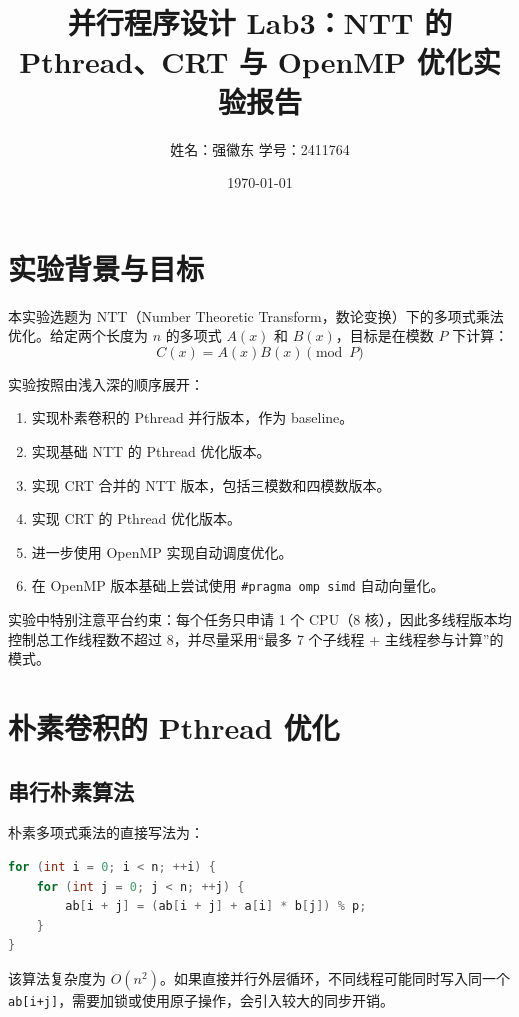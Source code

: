\documentclass[UTF8,a4paper,12pt]{ctexart}
\title{并行程序设计 Lab3：NTT 的 Pthread、CRT 与 OpenMP 优化实验报告}
\author{姓名：强徽东 {\hspace{3cm}} \quad 学号：2411764}
\date{\today}
\begin{document}
\maketitle

\section{实验背景与目标}

本实验选题为 NTT（Number Theoretic Transform，数论变换）下的多项式乘法优化。给定两个长度为 $n$ 的多项式 $A(x)$ 和 $B(x)$，目标是在模数 $P$ 下计算：
\[
C(x)=A(x)B(x)\pmod P
\]

实验按照由浅入深的顺序展开：

\begin{enumerate}
    \item 实现朴素卷积的 Pthread 并行版本，作为 baseline。
    \item 实现基础 NTT 的 Pthread 优化版本。
    \item 实现 CRT 合并的 NTT 版本，包括三模数和四模数版本。
    \item 实现 CRT 的 Pthread 优化版本。
    \item 进一步使用 OpenMP 实现自动调度优化。
    \item 在 OpenMP 版本基础上尝试使用 \texttt{\#pragma omp simd} 自动向量化。
\end{enumerate}

实验中特别注意平台约束：每个任务只申请 1 个 CPU（8 核），因此多线程版本均控制总工作线程数不超过 8，并尽量采用``最多 7 个子线程 + 主线程参与计算''的模式。

\section{朴素卷积的 Pthread 优化}

\subsection{串行朴素算法}

朴素多项式乘法的直接写法为：

\begin{lstlisting}[language=C++]
for (int i = 0; i < n; ++i) {
    for (int j = 0; j < n; ++j) {
        ab[i + j] = (ab[i + j] + a[i] * b[j]) % p;
    }
}
\end{lstlisting}

该算法复杂度为 $O(n^2)$。如果直接并行外层循环，不同线程可能同时写入同一个 \texttt{ab[i+j]}，需要加锁或使用原子操作，会引入较大的同步开销。
\end{document}
